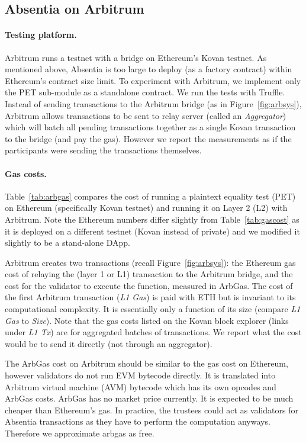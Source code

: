 \subsection{Absentia on Arbitrum}

\paragraph{Testing platform.} Arbitrum runs a testnet with a bridge on Ethereum's Kovan testnet. As mentioned above, Absentia is too large to deploy (as a factory contract) within Ethereum's contract size limit. To experiment with Arbitrum, we implement only the PET sub-module as a standalone contract. We run the tests with Truffle. Instead of sending transactions to the Arbitrum bridge (as in Figure~\ref{fig:arbsys}), Arbitrum allows transactions to be sent to relay server (called an \emph{Aggregator}) which will batch all pending transactions together as a single Kovan transaction to the bridge (and pay the gas). However we report the measurements as if the participants were sending the transactions themselves.



\paragraph{Gas costs.} Table~\ref{tab:arbgas} compares the cost of running a plaintext equality test (PET) on Ethereum (specifically Kovan testnet) and running it on Layer 2 (L2) with Arbitrum. Note the Ethereum numbers differ slightly from Table~\ref{tab:gascost} as it is deployed on a different testnet (Kovan instead of private) and we modified it slightly to be a stand-alone DApp.

Arbitrum creates two transactions (recall Figure~\ref{fig:arbsys}): the Ethereum gas cost of relaying the (layer 1 or L1) transaction to the Arbitrum bridge, and the cost for the validator to execute the function, measured in ArbGas. The cost of the first Arbitrum transaction (\emph{L1 Gas}) is paid with ETH but is invariant to its computational complexity. It is essentially only a function of its size (compare \emph{L1 Gas} to \emph{Size}).  Note that the gas costs listed on the Kovan block explorer (links under \emph{L1 Tx}) are for aggregated batches of transactions. We report what the cost would be to send it directly (not through an aggregator).

The ArbGas cost on Arbitrum should be similar to the gas cost on Ethereum, however validators do not run EVM bytecode directly. It is translated into Arbitrum virtual machine (AVM) bytecode which has its own opcodes and ArbGas costs. ArbGas has no market price currently. It is expected to be much cheaper than Ethereum's gas. In practice, the trustees could act as validators for Absentia transactions as they have to perform the computation anyways. Therefore we approximate arbgas as free.


